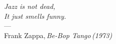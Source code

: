 
\thispagestyle{empty}


\vspace*{3cm}

\begin{center}{\slshape 
    Jazz is not dead,\\ 
    It just smells funny.} \\ \medskip
    ---\\
    Frank Zappa,\,\it{Be-Bop Tango}\,(1973)
\end{center}

\bigskip

